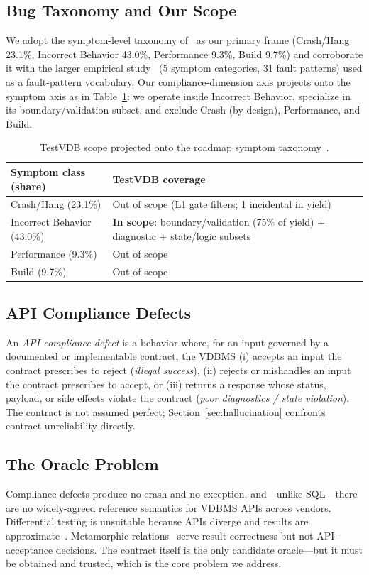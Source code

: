 \documentclass[sigconf]{acmart}
\begin{document}
\subsection{Bug Taxonomy and Our Scope}
We adopt the symptom-level taxonomy of~\cite{roadmap25} as our primary frame (Crash/Hang 23.1\%, Incorrect Behavior 43.0\%, Performance 9.3\%, Build 9.7\%) and corroborate it with the larger empirical study~\cite{bugstudy25} (5 symptom categories, 31 fault patterns) used as a fault-pattern vocabulary. Our compliance-dimension axis projects onto the symptom axis as in Table~\ref{tab:scope}: we operate inside Incorrect Behavior, specialize in its boundary/validation subset, and exclude Crash (by design), Performance, and Build.

\begin{table}[t]
\caption{TestVDB scope projected onto the roadmap symptom taxonomy~\cite{roadmap25}.}
\label{tab:scope}
\small
\begin{tabular}{@{}p{}p{}@{}}
\toprule
Symptom class (share) & TestVDB coverage \\
\midrule
Crash/Hang (23.1\%) & Out of scope (L1 gate filters; 1 incidental in yield) \\
Incorrect Behavior (43.0\%) & \textbf{In scope}: boundary/validation (75\% of yield) + diagnostic + state/logic subsets \\
Performance (9.3\%) & Out of scope \\
Build (9.7\%) & Out of scope \\
\bottomrule
\end{tabular}
\end{table}

\subsection{API Compliance Defects}
An \emph{API compliance defect} is a behavior where, for an input governed by a documented or implementable contract, the VDBMS (i) accepts an input the contract prescribes to reject (\emph{illegal success}), (ii) rejects or mishandles an input the contract prescribes to accept, or (iii) returns a response whose status, payload, or side effects violate the contract (\emph{poor diagnostics / state violation}). The contract is not assumed perfect; Section~\ref{sec:hallucination} confronts contract unreliability directly.

\subsection{The Oracle Problem}
Compliance defects produce no crash and no exception, and---unlike SQL---there are no widely-agreed reference semantics for VDBMS APIs across vendors. Differential testing is unsuitable because APIs diverge and results are approximate~\cite{roadmap25}. Metamorphic relations~\cite{metmap24} serve result correctness but not API-acceptance decisions. The contract itself is the only candidate oracle---but it must be obtained and trusted, which is the core problem we address.
\end{document}

